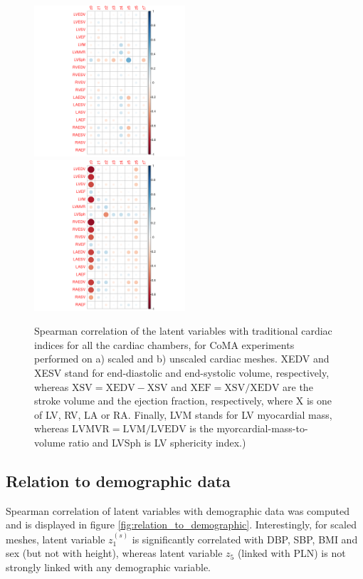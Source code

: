 \begin{figure}[ht!]
\includegraphics[width=0.5\textwidth]{figs/correlation/experiment_1_vs_cardiac_indices}
\includegraphics[width=0.5\textwidth]{figs/correlation/experiment_2_vs_cardiac_indices}
\caption{Spearman correlation of the latent variables with traditional cardiac indices for all the cardiac chambers, for CoMA experiments performed on a) scaled and b) unscaled cardiac meshes. XEDV and XESV stand for end-diastolic and end-systolic volume, respectively, whereas $\text{XSV}=\text{XEDV}-\text{XSV}$ and $\text{XEF}=\text{XSV}/\text{XEDV}$ are the stroke volume and the ejection fraction, respectively, where X is one of LV, RV, LA or RA. Finally, LVM stands for LV myocardial mass, whereas $\text{LVMVR}=\text{LVM}/\text{LVEDV}$ is the myorcardial-mass-to-volume ratio and LVSph is LV sphericity index.)}
\label{fig:relation_to_indices}
\end{figure}

\subsection*{Relation to demographic data}
Spearman correlation of latent variables with demographic data was computed and is displayed in figure \ref{fig:relation_to_demographic}.
Interestingly, for scaled meshes, latent variable $z_1^{(s)}$ is significantly correlated with DBP, SBP, BMI and sex (but not with height), whereas latent variable $z_5$ (linked with PLN) is not strongly linked with any demographic variable.

